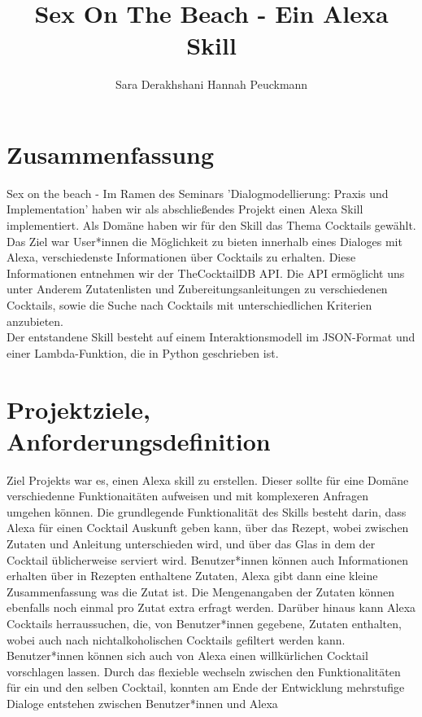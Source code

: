 \documentclass[12pt,letterpaper]{article}
\begin{document}
\title{Sex On The Beach - Ein Alexa Skill}
\author{Sara Derakhshani Hannah Peuckmann}
\maketitle
\thispagestyle{fancy}
\pagebreak
\tableofcontents
\pagebreak
\section{Zusammenfassung}
Sex on the beach - Im Ramen des Seminars 'Dialogmodellierung: Praxis und Implementation' haben wir als abschließendes Projekt einen Alexa Skill implementiert. Als Domäne haben wir für den Skill das Thema Cocktails gewählt. \\Das Ziel war User*innen die Möglichkeit zu bieten innerhalb eines Dialoges mit Alexa, verschiedenste Informationen über Cocktails zu erhalten. Diese Informationen entnehmen wir der TheCocktailDB API. Die API ermöglicht uns unter Anderem Zutatenlisten und Zubereitungsanleitungen zu verschiedenen Cocktails, sowie die Suche nach Cocktails mit unterschiedlichen Kriterien anzubieten. \\ Der entstandene Skill besteht auf einem Interaktionsmodell im JSON-Format und einer Lambda-Funktion, die in Python geschrieben ist. 

\section{Projektziele, Anforderungsdefinition}

Ziel Projekts war es, einen Alexa skill zu erstellen. Dieser sollte für eine Domäne verschiedenne Funktionaitäten aufweisen und mit komplexeren Anfragen umgehen können. 
Die grundlegende Funktionalität des Skills besteht darin, dass Alexa für einen Cocktail Auskunft geben kann, über das Rezept, wobei zwischen Zutaten und Anleitung unterschieden wird, und über das Glas in dem der Cocktail
üblicherweise serviert wird. Benutzer*innen können auch Informationen erhalten über in Rezepten enthaltene Zutaten,
Alexa gibt dann eine kleine Zusammenfassung was die Zutat ist. Die Mengenangaben der Zutaten können ebenfalls noch einmal pro Zutat extra erfragt werden.
Darüber hinaus kann Alexa Cocktails herraussuchen, die, von Benutzer*innen
gegebene, Zutaten enthalten, wobei auch nach nichtalkoholischen Cocktails gefiltert werden kann. 
Benutzer*innen können sich auch von Alexa einen willkürlichen Cocktail vorschlagen lassen.
Durch das flexieble wechseln zwischen den Funktionalitäten für ein und den selben Cocktail, konnten am Ende der Entwicklung mehrstufige Dialoge entstehen zwischen Benutzer*innen und Alexa 
\end{document}

